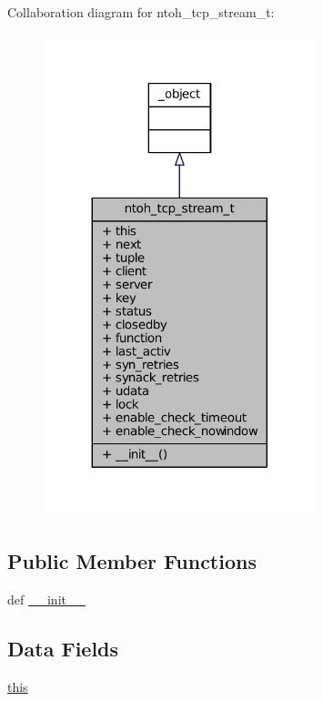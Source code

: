 Collaboration diagram for ntoh\-\_\-tcp\-\_\-stream\-\_\-t\-:
\nopagebreak
\begin{figure}[H]
\begin{center}
\leavevmode
\includegraphics[width=224pt]{classlibntoh_1_1ntoh__tcp__stream__t__coll__graph}
\end{center}
\end{figure}
\subsection*{Public Member Functions}
\begin{DoxyCompactItemize}
\item 
def \hyperlink{classlibntoh_1_1ntoh__tcp__stream__t_ac775ee34451fdfa742b318538164070e}{\-\_\-\-\_\-init\-\_\-\-\_\-}
\end{DoxyCompactItemize}
\subsection*{Data Fields}
\begin{DoxyCompactItemize}
\item 
\hyperlink{classlibntoh_1_1ntoh__tcp__stream__t_a05c09a5e9d53fa7adf0a7936038c2fa3}{this}
\end{DoxyCompactItemize}
